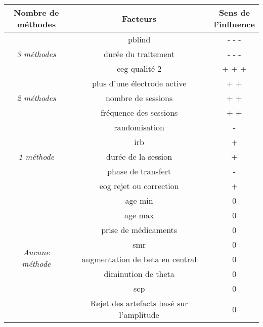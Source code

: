 \begin{center}
\small 
\begin{tabular}{ ccc }
\toprule
\shortstack{Nombre de \\ méthodes}  & Facteurs & \shortstack{ Sens de \\ l'influence } \\
\midrule
\multirow{ 3}{*}{ \textit{3 méthodes} } & \gls{pblind} & - - -\\ 
& durée du traitement & - - - \\  
& \gls{eeg} qualité 2 & + + + \\  
\midrule
\multirow{ 3}{*}{ \textit{2 méthodes} } & plus d'une électrode active & + + \\
& nombre de sessions & + + \\
& fréquence des sessions & + +\\
\midrule
\multirow{ 5}{*}{ \textit{1 méthode} } & randomisation & - \\
& \gls{irb} & + \\
& durée de la session & + \\
& phase de transfert & - \\ 
& \gls{eog} rejet ou correction & + \\
\midrule
\multirow{ 8}{*}{ \textit{ Aucune méthode } } & age min & 0 \\ 
& age max & 0\\  
& prise de médicaments & 0 \\
& \gls{smr} & 0 \\
& augmentation de beta en central & 0 \\
& diminution de theta & 0 \\
& \gls{scp} & 0 \\
& Rejet des artefacts basé sur l'amplitude & 0 \\
\bottomrule
\end{tabular}
\end{center}
